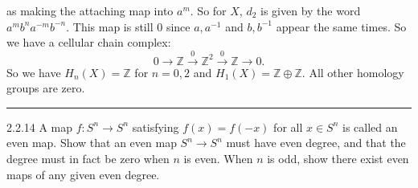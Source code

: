\documentclass[a4paper, 12pt]{article}
\begin{document}
\begin{solution}
\begin{enumerate}
as making the attaching map into \(a^m\). So for \(X\), \(d_2\) is given by the word \(a^mb^na^{-m}b^{-n}\). This map is still \(0\) since \(a,a^{-1}\) and \(b,b^{-1}\) appear the same times. So we have a cellular chain complex:
\[0\rightarrow \mathbb{Z}\xrightarrow{0}\mathbb{Z}^2\xrightarrow{0}\mathbb{Z}\rightarrow 0.\]
So we have \(H_n(X)=\mathbb{Z}\) for \(n=0,2\) and \(H_1(X)=\mathbb{Z}\oplus \mathbb{Z}\). All other homology groups are zero.
\end{enumerate}	
\end{solution}

\noindent\rule{7in}{2.8pt}
\begin{problem}{2.2.14}
A map \(f:S^n\rightarrow S^n\) satisfying \(f(x)=f(-x)\) for all \(x\in S^n\) is called an even map. Show that an even map \(S^n\rightarrow S^n\) must have even degree, and that the degree must in fact be zero when \(n\) is even. When \(n\) is odd, 
show there exist even maps of any given even degree.
\end{problem}
\end{document}
